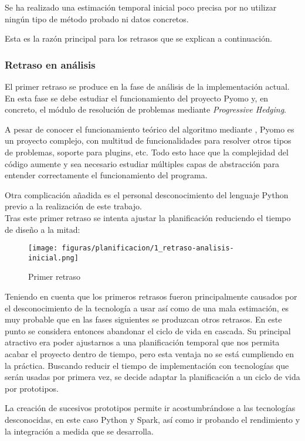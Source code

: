 Se ha realizado una estimación temporal inicial poco precisa por no utilizar ningún tipo de método probado ni datos concretos.

Esta es la razón principal para los retrasos que se explican a continuación.

\subsubsection{Retraso en análisis}

El primer retraso se produce en la fase de análisis de la implementación actual. En esta fase se debe estudiar el funcionamiento del proyecto Pyomo y, en concreto, el módulo de resolución de problemas mediante \textit{Progressive Hedging}. 

A pesar de conocer el funcionamiento teórico del algoritmo mediante \cite{progressiveHedging}, Pyomo es un proyecto complejo, con multitud de funcionalidades para resolver otros tipos de problemas, soporte para plugins, etc. Todo esto hace que la complejidad del código aumente y sea necesario estudiar múltiples capas de abstracción para entender correctamente el funcionamiento del programa.

Otra complicación añadida es el personal desconocimiento del lenguaje Python previo a la realización de este trabajo.\\

Tras este primer retraso se intenta ajustar la planificación reduciendo el tiempo de diseño a la mitad:

\begin{figure}[H]
    \centerline{\texttt{[image: figuras/planificacion/1\_retraso-analisis-inicial.png]}}
    \caption{Primer retraso}
\end{figure}

Teniendo en cuenta que los primeros retrasos fueron principalmente causados por el desconocimiento de la tecnología a usar así como de una mala estimación, es muy probable que en las fases siguientes se produzcan otros retrasos. En este punto se considera entonces abandonar el ciclo de vida en cascada. Su principal atractivo era poder ajustarnos a una planificación temporal que nos permita acabar el proyecto dentro de tiempo, pero esta ventaja no se está cumpliendo en la práctica. Buscando reducir el tiempo de implementación con tecnologías que serán usadas por primera vez, se decide adaptar la planificación a un ciclo de vida por prototipos. 

La creación de sucesivos prototipos permite ir acostumbrándose a las tecnologías desconocidas, en este caso Python y Spark, así como ir probando el rendimiento y la integración a medida que se desarrolla.

